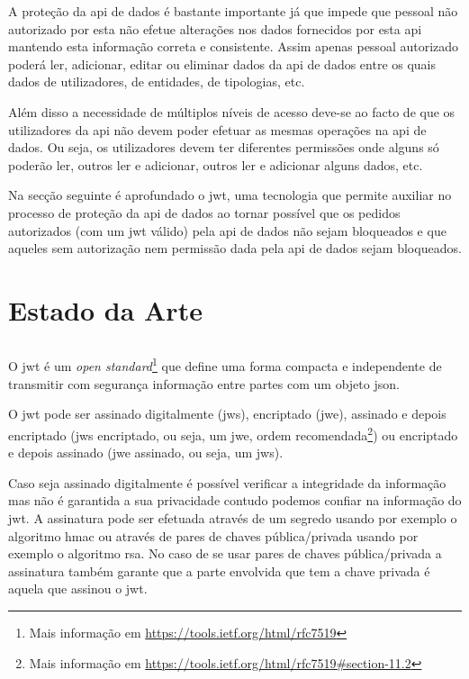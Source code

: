 A proteção da \acrshort{api} de dados é bastante importante já que impede que pessoal não autorizado por esta
não efetue alterações nos dados fornecidos por esta \acrshort{api} mantendo esta informação correta e consistente.
Assim apenas pessoal autorizado poderá ler, adicionar, editar ou eliminar dados da \acrshort{api} de dados entre os
quais dados de utilizadores, de entidades, de tipologias, etc.

Além disso a necessidade de múltiplos níveis de acesso deve-se ao facto de que os utilizadores da \acrshort{api}
não devem poder efetuar as mesmas operações na \acrshort{api} de dados. Ou seja, os utilizadores devem ter diferentes permissões
onde alguns só poderão ler, outros ler e adicionar, outros ler e adicionar alguns dados, etc.

Na secção seguinte é aprofundado o \acrshort{jwt}, uma tecnologia que permite auxiliar no processo de proteção
da \acrshort{api} de dados ao tornar possível que os pedidos autorizados (com um \acrshort{jwt} válido) pela 
\acrshort{api} de dados não sejam bloqueados e que aqueles sem autorização nem permissão dada pela \acrshort{api}
de dados sejam bloqueados.

\section{Estado da Arte}

\subsection{}
O \acrshort{jwt} é um 
\textit{open standard}\footnote{Mais informação em \url{https://tools.ietf.org/html/rfc7519}} 
que define uma forma compacta e independente de transmitir com segurança informação entre partes com um objeto 
\acrshort{json}.~\cite{jwtio} 

O \acrshort{jwt} pode ser assinado digitalmente (\acrshort{jws}), encriptado (\acrshort{jwe}), assinado e depois 
encriptado (\acrshort{jws} encriptado, ou seja, um \acrshort{jwe}, ordem 
recomendada\footnote{Mais informação em \url{https://tools.ietf.org/html/rfc7519\#section-11.2}}) ou encriptado e 
depois assinado (\acrshort{jwe} assinado, ou seja, um \acrshort{jws}).

Caso seja assinado digitalmente é possível verificar a integridade da informação mas não é garantida a sua 
privacidade contudo podemos confiar na informação do \acrshort{jwt}. A assinatura pode ser efetuada através de 
um segredo usando por exemplo o algoritmo \acrshort{hmac} ou através de pares de chaves pública/privada usando 
por exemplo o algoritmo \acrshort{rsa}. No caso de se usar pares de chaves pública/privada a assinatura também 
garante que a parte envolvida que tem a chave privada é aquela que assinou o \acrshort{jwt}.

